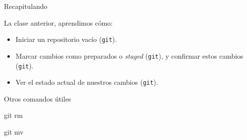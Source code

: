 \begin{frame}[t]{Recapitulando}
    \begin{block}{La clase anterior, aprendimos cómo:}
        \begin{itemize}
        \pause
            \item Iniciar un repositorio vacío (\texttt{git}).
            \pause\pause
            \item Marcar cambios como preparados o \textit{staged} (\texttt{git}), y confirmar estos cambios (\texttt{git}).
            \pause\pause\pause
            \item Ver el estado actual de nuestros cambios (\texttt{git}).\pause
        \end{itemize}
    \end{block}
\end{frame}


\begin{frame}[t]{Otros comandos útiles}
    \begin{comando}
        git rm
    \end{comando}


    \vspace{2em}

    \begin{comando}
        git mv
    \end{comando}

\end{frame}


